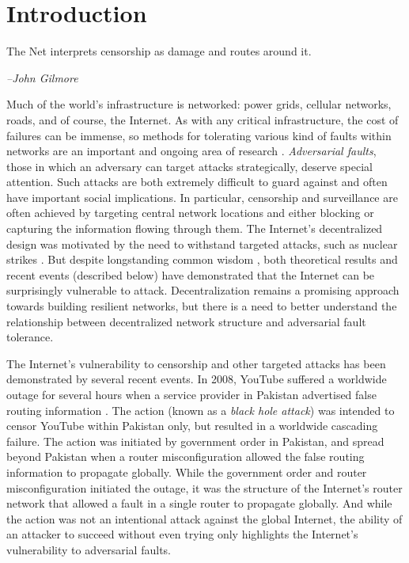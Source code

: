 \documentclass[twocolumn]{article}
\begin{document}
\section{Introduction}

\epigraph{The Net interprets censorship as damage and routes around it.}{\textit{--John Gilmore} \cite{elmer-dewitt_first_1993}}

Much of the world's infrastructure is networked: power grids,
cellular networks, roads, and of course, the Internet.
As with any critical infrastructure, the cost of failures can be
immense, so methods for tolerating various kind of faults within networks are an
important and ongoing area of research
\cite{zin_survey_2015,albert_error_2000,sterbenz_resilience_2010}.
{\em Adversarial faults},
those in which an adversary can target attacks strategically,
deserve special attention.
Such attacks are both extremely difficult to guard against and 
often have important social implications.
In particular, censorship and surveillance are often achieved
by targeting central network locations and either blocking or capturing
the information flowing through them.
The Internet's decentralized design was motivated
by the need to withstand targeted attacks, such as nuclear strikes
\cite{baran_distributed_1964}.
But despite longstanding common wisdom \cite{elmer-dewitt_first_1993},
both theoretical results and recent events (described below)
have demonstrated that the Internet can be surprisingly vulnerable to attack.
Decentralization remains a promising approach towards
building resilient networks,
but there is a need to better understand the relationship between
decentralized network structure and adversarial fault tolerance.

The Internet's vulnerability to censorship and other targeted attacks
has been demonstrated by several recent events.
In 2008, YouTube suffered a worldwide outage for several hours
when a service provider in Pakistan advertised false routing information
\cite{hunter_pakistan_2008}.
The action (known as a {\em black hole attack}) was intended to censor YouTube
within Pakistan only, but resulted in a worldwide cascading failure.
The action was initiated by government order in Pakistan,
and spread beyond Pakistan when a router misconfiguration allowed the false
routing information to propagate globally.
While the government order and router misconfiguration initiated the outage,
it was the structure of the Internet's router network that allowed a fault in a
single router to propagate globally.
And while the action was not an intentional attack against the global Internet,
the ability of an attacker to succeed without even trying only highlights
the Internet's vulnerability to adversarial faults.
\end{document}
